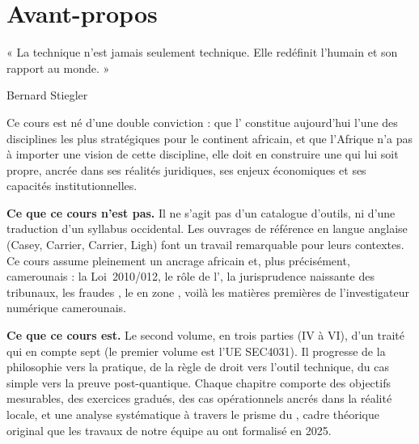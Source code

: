 
\chapter*{Avant-propos}

\epigraph{%
    « La technique n'est jamais seulement technique.
    Elle redéfinit l'humain et son rapport au monde. »%
}{Bernard Stiegler}

\vspace{0.5ex}

Ce cours est né d'une double conviction : que l'
constitue aujourd'hui l'une des disciplines les plus stratégiques pour le continent
africain, et que l'Afrique n'a pas à importer une vision de cette discipline, elle
doit en construire une qui lui soit propre, ancrée dans ses réalités juridiques, ses
enjeux économiques et ses capacités institutionnelles.

\bigskip

\textbf{Ce que ce cours n'est pas.} Il ne s'agit pas d'un catalogue d'outils, ni
d'une traduction d'un syllabus occidental. Les ouvrages de référence en langue
anglaise (Casey, Carrier, Carrier, Ligh) font un travail remarquable pour leurs
contextes. Ce cours assume pleinement un ancrage africain et, plus précisément,
camerounais : la Loi~2010/012, le rôle de l', la jurisprudence
naissante des tribunaux, les fraudes ,
le  en zone , voilà les matières premières
de l'investigateur numérique camerounais.

\bigskip

\textbf{Ce que ce cours est.} Le second volume, en trois parties (IV à VI), d'un
traité qui en compte sept (le premier volume est l'UE SEC4031). Il progresse de la
philosophie vers la pratique, de la règle de droit vers l'outil technique, du cas
simple vers la preuve post-quantique. Chaque chapitre comporte des objectifs
mesurables, des exercices gradués, des cas opérationnels ancrés dans la réalité
locale, et une analyse systématique à travers le prisme du , cadre théorique original que les travaux de notre équipe au  ont
formalisé en 2025.

